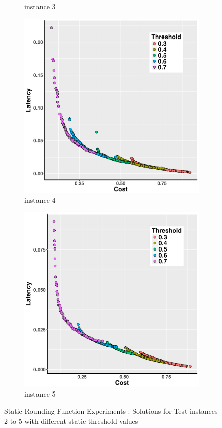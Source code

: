 \documentclass[10pt,journal,compsoc]{IEEEtran}
\begin{document}
\begin{figure}[h!]
\begin{subfigure}{0.49\linewidth}
    \caption{instance 3}
   \end{subfigure}
   \begin{subfigure}{0.49\linewidth}
       \includegraphics[width=\textwidth]{pics/static_threshold_problem_4.png}
    \caption{instance 4}
   \end{subfigure}
   \begin{subfigure}{0.49\linewidth}
       \includegraphics[width=\textwidth]{pics/static_threshold_problem_5.png}
    \caption{instance 5}
   \end{subfigure}
   \caption{Static Rounding Function Experiments : Solutions for Test instances 2 to 5 with different static threshold values}
   \label{fig:staticFunctions}
\end{figure}
\end{document}

